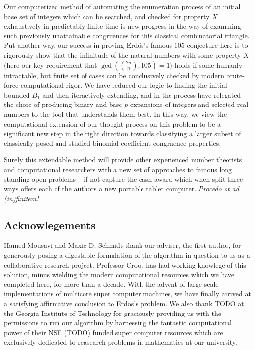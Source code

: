 \documentclass[12pt]{article}
\begin{document}
Our computerized method of automating the enumeration process 
of an initial base set of integers which can be searched, and checked for property $X$ exhaustively in 
predictably finite time is new progress in the way of examining such previously unattainable 
congruences for this classical combinatorial triangle. Put another way, our success in proving 
Erd\"os's famous $105$-conjecture here is to rigorously show that the infinitude of the natural numbers 
with some property $X$ (here our key requirement that $\gcd(\binom{2n}{n}, 105)=1$) holds if 
some humanly intractable, but finite set of cases can be conclusively checked by modern brute-force 
computational rigor. We have reduced our logic to finding the initial bounded $B_1$ and 
then iteractively extending, and in the process have relegated the chore of producing binary and 
base-$p$ expansions of integers and selected real numbers to the tool that understands them best. 
In this way, we view the computational extension of our thought process on this problem to be a 
significant new step in the right direction towards classifying a larger subset of classically 
posed and studied binomial coefficient congruence properties. 

Surely this extendable method will 
provide other experienced number theorists and computational researchers with a new set of 
approaches to famous long standing open problems -- if not capture the cash award which when 
split three ways offers each of the authors a new portable tablet computer. 
\emph{Procedo at ad (in)finitem!}

\subsection*{Acknowlegements} 

Hamed Mousavi and Maxie D. Schmidt thank our adviser, the first author, 
for generously posing a digestable formulation of the algorithm in question to us as a 
collaborative research project. Professor Croot has had working knowlege of this solution, minus 
wielding the modern computational resources which we have completed here, for more than a decade. 
With the advent of large-scale implementations of multicore super computer machines, we have finally 
arrived at a satisfying affirmative conclusion to Erd\"os's problem. 
We also thank TODO at the Georgia Institute of Technology for graciously providing us with the 
permissions to run our algorithm by harnessing the fantastic computational power of their NSF (TODO) 
funded super computer resources which are exclusively dedicated to reasearch problems in mathematics at 
our university. 
\end{document}
